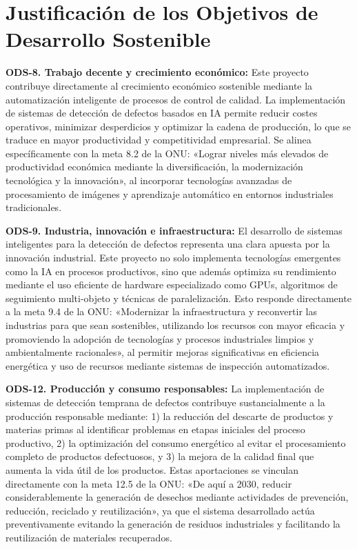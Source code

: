 \documentclass[11pt,spanish,listoffigures,listoftables]{tfgetsinf}
\begin{document}
   \section*{Justificación de los Objetivos de Desarrollo Sostenible} \label{sec:justificacion_ods}

   \textbf{ODS-8. Trabajo decente y crecimiento económico:} Este proyecto contribuye directamente al crecimiento económico sostenible mediante la automatización inteligente de procesos de control de calidad. La implementación de sistemas de detección de defectos basados en IA permite reducir costes operativos, minimizar desperdicios y optimizar la cadena de producción, lo que se traduce en mayor productividad y competitividad empresarial. Se alinea específicamente con la meta 8.2 de la ONU: «Lograr niveles más elevados de productividad económica mediante la diversificación, la modernización tecnológica y la innovación», al incorporar tecnologías avanzadas de procesamiento de imágenes y aprendizaje automático en entornos industriales tradicionales.

   \textbf{ODS-9. Industria, innovación e infraestructura:} El desarrollo de sistemas inteligentes para la detección de defectos representa una clara apuesta por la innovación industrial. Este proyecto no solo implementa tecnologías emergentes como la IA en procesos productivos, sino que además optimiza su rendimiento mediante el uso eficiente de hardware especializado como GPUs, algoritmos de seguimiento multi-objeto y técnicas de paralelización. Esto responde directamente a la meta 9.4 de la ONU: «Modernizar la infraestructura y reconvertir las industrias para que sean sostenibles, utilizando los recursos con mayor eficacia y promoviendo la adopción de tecnologías y procesos industriales limpios y ambientalmente racionales», al permitir mejoras significativas en eficiencia energética y uso de recursos mediante sistemas de inspección automatizados.

   \textbf{ODS-12. Producción y consumo responsables:} La implementación de sistemas de detección temprana de defectos contribuye sustancialmente a la producción responsable mediante: 1) la reducción del descarte de productos y materias primas al identificar problemas en etapas iniciales del proceso productivo, 2) la optimización del consumo energético al evitar el procesamiento completo de productos defectuosos, y 3) la mejora de la calidad final que aumenta la vida útil de los productos. Estas aportaciones se vinculan directamente con la meta 12.5 de la ONU: «De aquí a 2030, reducir considerablemente la generación de desechos mediante actividades de prevención, reducción, reciclado y reutilización», ya que el sistema desarrollado actúa preventivamente evitando la generación de residuos industriales y facilitando la reutilización de materiales recuperados.

\printglossaries
\end{document}
